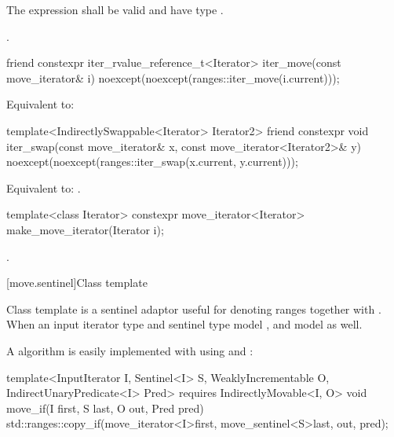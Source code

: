 \begin{itemdescr}
\pnum
\constraints
The expression  shall be valid and have type .

\pnum
\returns {}.
\end{itemdescr}

%
\begin{itemdecl}
friend constexpr iter_rvalue_reference_t<Iterator>
  iter_move(const move_iterator& i)
    noexcept(noexcept(ranges::iter_move(i.current)));
\end{itemdecl}

\begin{itemdescr}
\pnum
\effects Equivalent to: 
\end{itemdescr}

%
\begin{itemdecl}
template<IndirectlySwappable<Iterator> Iterator2>
  friend constexpr void
    iter_swap(const move_iterator& x, const move_iterator<Iterator2>& y)
      noexcept(noexcept(ranges::iter_swap(x.current, y.current)));
\end{itemdecl}

\begin{itemdescr}
\pnum
\effects Equivalent to: .
\end{itemdescr}

%
\begin{itemdecl}
template<class Iterator>
constexpr move_iterator<Iterator> make_move_iterator(Iterator i);
\end{itemdecl}

\begin{itemdescr}
\pnum
\returns {}.
\end{itemdescr}

[move.sentinel]{Class template }

\pnum
Class template  is a sentinel adaptor useful for denoting
ranges together with . When an input iterator type
 and sentinel type  model ,
 and  model
 as well.

\pnum
\begin{example}
A  algorithm is easily implemented with
 using  and :

\begin{codeblock}
template<InputIterator I, Sentinel<I> S, WeaklyIncrementable O,
         IndirectUnaryPredicate<I> Pred>
  requires IndirectlyMovable<I, O>
void move_if(I first, S last, O out, Pred pred) {
  std::ranges::copy_if(move_iterator<I>{first}, move_sentinel<S>{last}, out, pred);
}
\end{codeblock}
\end{example}

